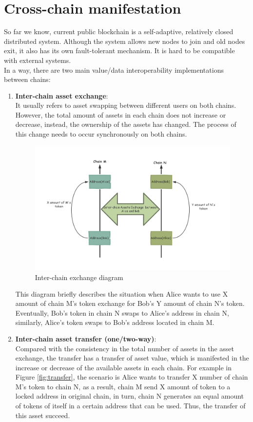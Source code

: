 \section{Cross-chain manifestation}
\noindent So far we know, current public blockchain is a self-adaptive, relatively closed distributed system. Although the system allows new nodes to join and old nodes exit, it also has its own fault-tolerant mechanism. It is hard to be compatible with external systems. \\
\noindent In a way, there are two main value/data interoperability implementations between chains:
\begin{enumerate}
    \item \textbf{Inter-chain asset exchange}: \\
    It usually refers to asset swapping between different users on both chains. However, the total amount of assets in each chain does not increase or decrease, instead, the ownership of the assets has changed. The process of this change needs to occur synchronously on both chains. \\
    \begin{figure}[H]
    \includegraphics[width=1\textwidth]{./figures/asset_swap.png}
    \centering
    \caption{Inter-chain exchange diagram}%
    \centering
    \label{fig:swap}
    \end{figure}
    This diagram briefly describes the situation when Alice wants to use X amount of chain M's token exchange for Bob's Y amount of chain N's token. Eventually, Bob's token in chain N swaps to Alice's address in chain N, similarly, Alice's token swaps to Bob's address located in chain M.
    \item \textbf{Inter-chain asset transfer (one/two-way)}: \\
    Compared with the consistency in the total number of assets in the asset exchange, the transfer has a transfer of asset value, which is manifested in the increase or decrease of the available assets in each chain. For example in Figure \ref{fig:transfer}, the scenario is Alice wants to transfer X number of chain M's token to chain N, as a result, chain M send X amount of token to a locked address in original chain, in turn, chain N generates an equal amount of tokens of itself in a certain address that can be used. Thus, the transfer of this asset succeed.
    

\end{enumerate}
